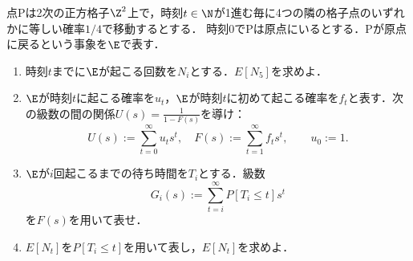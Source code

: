 \documentclass[uplatex,dvipdfmx]{jsarticle}
\begin{document}
\begin{tcolorbox}[colframe=ForestGreen, colback=ForestGreen!10!white,breakable,colbacktitle=ForestGreen!40!white,coltitle=black,fonttitle=\bfseries\sffamily,
    title=第４問]
    \begin{problem}\label{prob-18-1-4-RandomWalk}
        点Pは2次の正方格子$\Z^2$上で，時刻$t\in\N$が1進む毎に4つの隣の格子点のいずれかに等しい確率$1/4$で移動するとする．
        時刻$0$でPは原点にいるとする．Pが原点に戻るという事象を$\E$で表す．
        \begin{enumerate}[{問}1]
            \item 時刻$t$までに$\E$が起こる回数を$N_i$とする．$E[N_5]$を求めよ．
            \item $\E$が時刻$t$に起こる確率を$u_t$，$\E$が時刻$t$に初めて起こる確率を$f_t$と表す．次の級数の間の関係$U(s)=\frac{1}{1-F(s)}$を導け：
            \[U(s):=\sum_{t=0}^\infty u_ts^t,\quad F(s):=\sum_{t=1}^\infty f_ts^t,\qquad u_0:=1.\]
            \item $\E$が$i$回起こるまでの待ち時間を$T_i$とする．級数
            \[G_i(s):=\sum_{t=i}^\infty P[T_i\le t]s^t\]
            を$F(s)$を用いて表せ．
            \item $E[N_t]$を$P[T_i\le t]$を用いて表し，$E[N_t]$を求めよ．
        \end{enumerate}
    \end{problem}
\end{tcolorbox}
\end{document}
